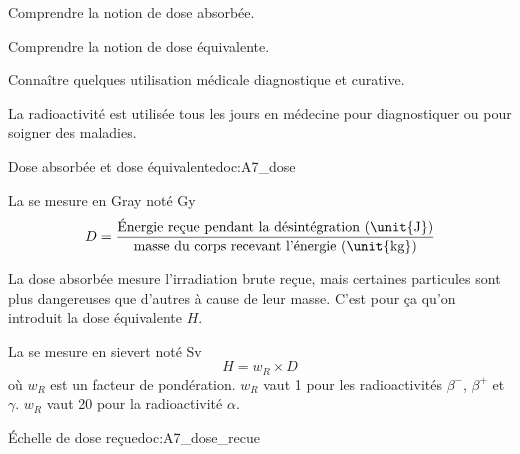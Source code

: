 \teteTermStssImag
\vspace*{-24pt}

\begin{objectifs}
  \item Comprendre la notion de dose absorbée.
  \item Comprendre la notion de dose équivalente.
  \item Connaître quelques utilisation médicale diagnostique et curative.
\end{objectifs}

\begin{contexte}
  La radioactivité est utilisée tous les jours en médecine pour diagnostiquer ou pour soigner des maladies.
  
\end{contexte}


\begin{doc}{Dose absorbée et dose équivalente}{doc:A7_dose}
  \begin{importants}
    La  se mesure en Gray noté \unit{\gray}
    \begin{equation*}
      D =
      \dfrac{\text{Énergie reçue pendant la désintégration (\unit{J})}}
      {\text{masse du corps recevant l'énergie (\unit{kg})}}
    \end{equation*}
  \end{importants}
  
  La dose absorbée mesure l'irradiation brute reçue, mais certaines particules sont plus dangereuses que d'autres à cause de leur masse.
  C'est pour ça qu'on introduit la dose équivalente $H$.
  \begin{importants}
    La  se mesure en sievert noté \unit{\sievert}
    \begin{equation*}
      H = w_R \times D
    \end{equation*}
    où $w_R$ est un facteur de pondération. $w_R$ vaut 1 pour les radioactivités $\beta^-$, $\beta^+$ et $\gamma$.
    $w_R$ vaut 20 pour la radioactivité $\alpha$.
  \end{importants}
\end{doc}

\begin{doc}{Échelle de dose reçue}{doc:A7_dose_recue}
  \centering
\end{doc}

